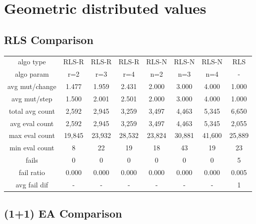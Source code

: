 
\section{Geometric distributed values}

\subsection{RLS Comparison}


\begin{tabular}[h]{cccccccc}
algo type&         RLS-R&  RLS-R&  RLS-R&  RLS-N&  RLS-N&  RLS-N&    RLS\\
algo param&          r=2&    r=3&    r=4&    n=2&    n=3&    n=4&      -\\
avg mut/change&    1.477&  1.959&  2.431&  2.000&  3.000&  4.000&  1.000\\
avg mut/step&      1.500&  2.001&  2.501&  2.000&  3.000&  4.000&  1.000\\
\hline
total avg count&   2,592&  2,945&  3,259&  3,497&  4,463&  5,345&  6,650\\
avg eval count&    2,592&  2,945&  3,259&  3,497&  4,463&  5,345&  2,055\\
max eval count&   19,845& 23,932& 28,532& 23,824& 30,881& 41,600& 25,889\\
min eval count&        8&     22&     19&     18&     43&     19&     23\\
\hline
fails&                 0&      0&      0&      0&      0&      0&      5\\
fail ratio&        0.000&  0.000&  0.000&  0.000&  0.000&  0.000&  0.005\\
avg fail dif&          -&      -&      -&      -&      -&      -&      1\\
\end{tabular}


\subsection{(1+1) EA Comparison}


